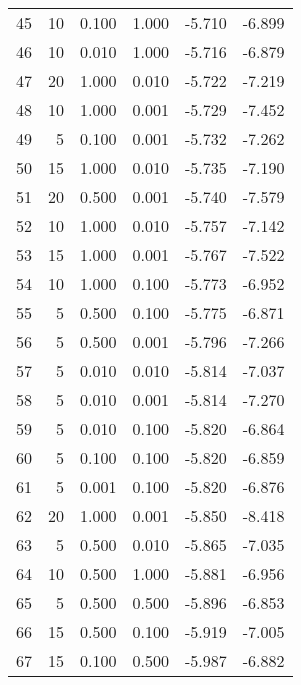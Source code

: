 \begin{tabular}{rrrrrr}
    45 &        10 &  0.100 & 1.000 &                 -5.710 &      -6.899 \\
    46 &        10 &  0.010 & 1.000 &                 -5.716 &      -6.879 \\
    47 &        20 &  1.000 & 0.010 &                 -5.722 &      -7.219 \\
    48 &        10 &  1.000 & 0.001 &                 -5.729 &      -7.452 \\
    49 &         5 &  0.100 & 0.001 &                 -5.732 &      -7.262 \\
    50 &        15 &  1.000 & 0.010 &                 -5.735 &      -7.190 \\
    51 &        20 &  0.500 & 0.001 &                 -5.740 &      -7.579 \\
    52 &        10 &  1.000 & 0.010 &                 -5.757 &      -7.142 \\
    53 &        15 &  1.000 & 0.001 &                 -5.767 &      -7.522 \\
    54 &        10 &  1.000 & 0.100 &                 -5.773 &      -6.952 \\
    55 &         5 &  0.500 & 0.100 &                 -5.775 &      -6.871 \\
    56 &         5 &  0.500 & 0.001 &                 -5.796 &      -7.266 \\
    57 &         5 &  0.010 & 0.010 &                 -5.814 &      -7.037 \\
    58 &         5 &  0.010 & 0.001 &                 -5.814 &      -7.270 \\
    59 &         5 &  0.010 & 0.100 &                 -5.820 &      -6.864 \\
    60 &         5 &  0.100 & 0.100 &                 -5.820 &      -6.859 \\
    61 &         5 &  0.001 & 0.100 &                 -5.820 &      -6.876 \\
    62 &        20 &  1.000 & 0.001 &                 -5.850 &      -8.418 \\
    63 &         5 &  0.500 & 0.010 &                 -5.865 &      -7.035 \\
    64 &        10 &  0.500 & 1.000 &                 -5.881 &      -6.956 \\
    65 &         5 &  0.500 & 0.500 &                 -5.896 &      -6.853 \\
    66 &        15 &  0.500 & 0.100 &                 -5.919 &      -7.005 \\
    67 &        15 &  0.100 & 0.500 &                 -5.987 &      -6.882 \\

\end{tabular}
